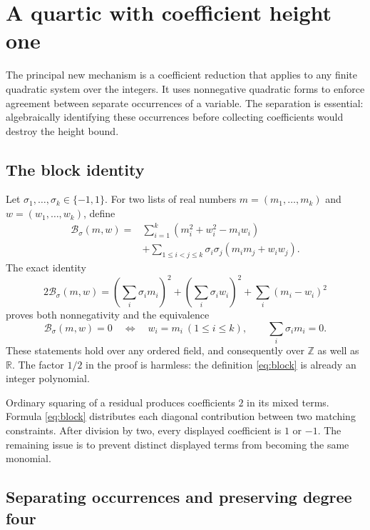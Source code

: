\section{A quartic with coefficient height one}\label{sec:heightone}

The principal new mechanism is a coefficient reduction that applies to any
finite quadratic system over the integers. It uses nonnegative quadratic
forms to enforce agreement between separate occurrences of a variable.
The separation is essential: algebraically identifying these occurrences
before collecting coefficients would destroy the height bound.

\subsection{The block identity}

Let $\sigma_1,\ldots,\sigma_k\in\{-1,1\}$. For two lists of real numbers
$m=(m_1,\ldots,m_k)$ and $w=(w_1,\ldots,w_k)$, define
\begin{align}
\mathcal B_\sigma(m,w)
  ={}&\sum_{i=1}^k(m_i^2+w_i^2-m_iw_i)\\[-2mm]
   &+\sum_{1\le i<j\le k}\sigma_i\sigma_j(m_im_j+w_iw_j).
   \label{eq:block}
\end{align}
The exact identity
\begin{equation}
 2\mathcal B_\sigma(m,w)=
 \left(\sum_i\sigma_i m_i\right)^2+
 \left(\sum_i\sigma_i w_i\right)^2+
 \sum_i(m_i-w_i)^2
 \label{eq:block-sos}
\end{equation}
proves both nonnegativity and the equivalence
\begin{equation}
 \mathcal B_\sigma(m,w)=0
 \quad\Longleftrightarrow\quad
 w_i=m_i\ (1\le i\le k),\qquad \sum_i\sigma_i m_i=0.
 \label{eq:block-zero}
\end{equation}
These statements hold over any ordered field, and consequently over
$\mathbb Z$ as well as $\mathbb R$. The factor $1/2$ in the proof is harmless:
the definition \eqref{eq:block} is already an integer polynomial.

Ordinary squaring of a residual produces coefficients $2$ in its mixed
terms. Formula \eqref{eq:block} distributes each diagonal contribution
between two matching constraints. After division by two, every displayed
coefficient is $1$ or $-1$. The remaining issue is to prevent distinct
displayed terms from becoming the same monomial.

\subsection{Separating occurrences and preserving degree four}

